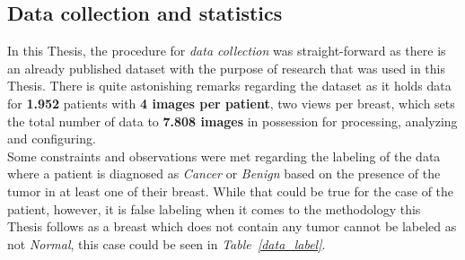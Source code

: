 \documentclass[12pt]{extarticle}
\begin{document}
	\subsection{Data collection and statistics}
	In this Thesis, the procedure for \emph{data collection} was straight-forward as there is an already published dataset \cite{Dataset} with the purpose of research that was used in this Thesis. There is quite astonishing remarks regarding the dataset as it holds data for \textbf{1.952} patients with \textbf{4 images per patient}, two views per breast, which sets the total number of data to \textbf{7.808 images} in possession for processing, analyzing and configuring.\\[5mm]
	Some constraints and observations were met regarding the labeling of the data where a patient is diagnosed as \emph{Cancer} or \emph{Benign} based on the presence of the tumor in at least one of their breast. While that could be true for the case of the patient, however, it is false labeling when it comes to the methodology this Thesis follows as a breast which does not contain any tumor cannot be labeled as not \emph{Normal}, this case could be seen in \emph{Table~\ref{data_label}}.
\end{document}

